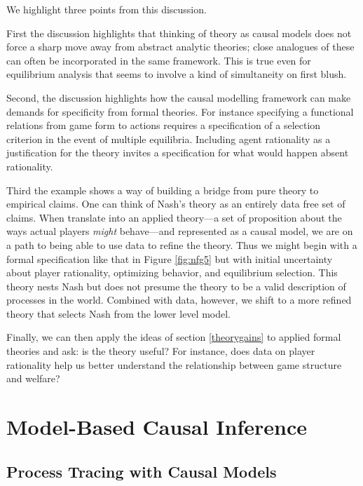 \documentclass[
  12pt,
]{book}
\begin{document}
We highlight three points from this discussion.

First the discussion highlights that thinking of theory as causal models does not force a sharp move away from abstract analytic theories; close analogues of these can often be incorporated in the same framework. This is true even for equilibrium analysis that seems to involve a kind of simultaneity on first blush.

Second, the discussion highlights how the causal modelling framework can make demands for specificity from formal theories. For instance specifying a functional relations from game form to actions requires a specification of a selection criterion in the event of multiple equilibria. Including agent rationality as a justification for the theory invites a specification for what would happen absent rationality.

Third the example shows a way of building a bridge from pure theory to empirical claims. One can think of Nash's theory as an entirely data free set of claims. When translate into an applied theory---a set of proposition about the ways actual players \emph{might} behave---and represented as a causal model, we are on a path to being able to use data to refine the theory. Thus we might begin with a formal specification like that in Figure \ref{fig:nfg5} but with initial uncertainty about player rationality, optimizing behavior, and equilibrium selection. This theory nests Nash but does not presume the theory to be a valid description of processes in the world. Combined with data, however, we shift to a more refined theory that selects Nash from the lower level model.

Finally, we can then apply the ideas of section \ref{theorygains} to applied formal theories and ask: is the theory useful? For instance, does data on player rationality help us better understand the relationship between game structure and welfare?

\hypertarget{part-model-based-causal-inference}{%
\part{Model-Based Causal Inference}\label{part-model-based-causal-inference}}

\hypertarget{pt}{%
\chapter{Process Tracing with Causal Models}\label{pt}}
\end{document}
